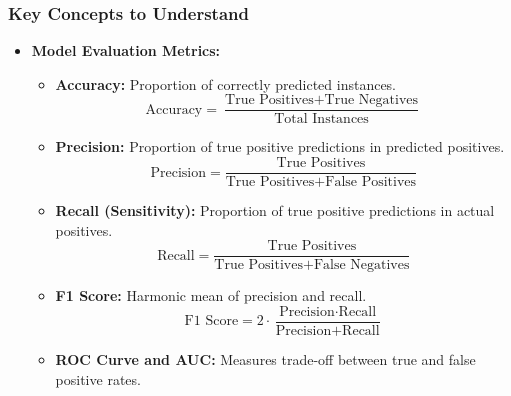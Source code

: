 \documentclass[aspectratio=169]{beamer}
\begin{document}
\begin{frame}[fragile]
    \frametitle{Key Concepts to Understand}
    \begin{itemize}
        \item \textbf{Model Evaluation Metrics:}
        \begin{itemize}
            \item \textbf{Accuracy:} Proportion of correctly predicted instances. 
            \begin{equation}
            \text{Accuracy} = \frac{\text{True Positives} + \text{True Negatives}}{\text{Total Instances}}
            \end{equation}
            \item \textbf{Precision:} Proportion of true positive predictions in predicted positives. 
            \begin{equation}
            \text{Precision} = \frac{\text{True Positives}}{\text{True Positives} + \text{False Positives}}
            \end{equation}
            \item \textbf{Recall (Sensitivity):} Proportion of true positive predictions in actual positives.
            \begin{equation}
            \text{Recall} = \frac{\text{True Positives}}{\text{True Positives} + \text{False Negatives}}
            \end{equation}
            \item \textbf{F1 Score:} Harmonic mean of precision and recall.
            \begin{equation}
            \text{F1 Score} = 2 \cdot \frac{\text{Precision} \cdot \text{Recall}}{\text{Precision} + \text{Recall}}
            \end{equation}
            \item \textbf{ROC Curve and AUC:} Measures trade-off between true and false positive rates.
        \end{itemize}
    \end{itemize}
\end{frame}
\end{document}
